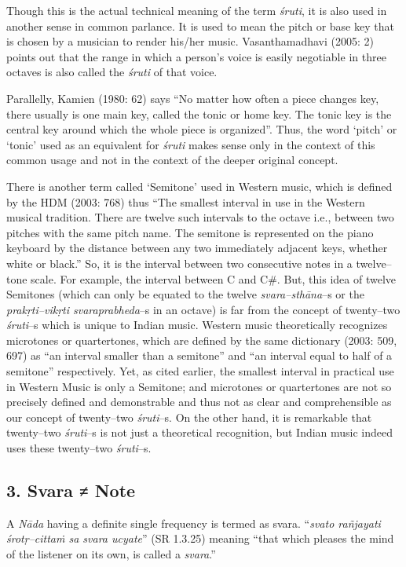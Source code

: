 Though this is the actual technical meaning of the term \textit{śruti}, it is also used in another sense in common parlance. It is used to mean the pitch or base key that is chosen by a musician to render his/her music. Vasanthamadhavi (2005: 2) points out that the range in which a person’s voice is easily negotiable in three octaves is also called the \textit{śruti} of that voice. 

Parallelly, Kamien (1980: 62) says “No matter how often a piece changes key, there usually is one main key, called the tonic or home key. The tonic key is the central key around which the whole piece is organized”. Thus, the word ‘pitch’ or ‘tonic’ used as an equivalent for \textit{śruti} makes sense only in the context of this common usage and not in the context of the deeper original concept.

There is another term called ‘Semitone’ used in Western music, which is defined by the HDM (2003: 768) thus “The smallest interval in use in the Western musical tradition. There are twelve such intervals to the octave i.e., between two pitches with the same pitch name. The semitone is represented on the piano keyboard by the distance between any two immediately adjacent keys, whether white or black.” So, it is the interval between two consecutive notes in a twelve–tone scale. For example, the interval between C and C\#. But, this idea of twelve Semitones (which can only be equated to the twelve \textit{svara–sthāna}–s or the \textit{prakṛti–vikṛti svaraprabheda}–s in an octave) is far from the concept of twenty–two \textit{śruti}–s which is unique to Indian music. Western music theoretically recognizes microtones or quartertones, which are defined by the same dictionary (2003: 509, 697) as “an interval smaller than a semitone” and “an interval equal to half of a semitone” respectively. Yet, as cited earlier, the smallest interval in practical use in Western Music is only a Semitone; and microtones or quartertones are not so precisely defined and demonstrable and thus not as clear and comprehensible as our concept of twenty–two \textit{śruti}–s. On the other hand, it is remarkable that twenty–two \textit{śruti}–s is not just a theoretical recognition, but Indian music indeed uses these twenty–two \textit{śruti}–s.


\subsection*{3. Svara ≠ Note}

A \textit{Nāda} having a definite single frequency is termed as svara. “\textit{svato rañjayati śrotṛ–cittaṁ sa svara ucyate}” (SR 1.3.25) meaning “that which pleases the mind of the listener on its own, is called a \textit{svara}.”


